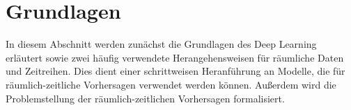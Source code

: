 \section{Grundlagen}
\label{sec:Grundlagen}

In diesem Abschnitt werden zunächst die Grundlagen des Deep Learning erläutert sowie zwei häufig verwendete Herangehensweisen für räumliche Daten und Zeitreihen.
Dies dient einer schrittweisen Heranführung an Modelle, die für räumlich-zeitliche Vorhersagen verwendet werden können.
Außerdem wird die Problemstellung der räumlich-zeitlichen Vorhersagen formalisiert.







%
